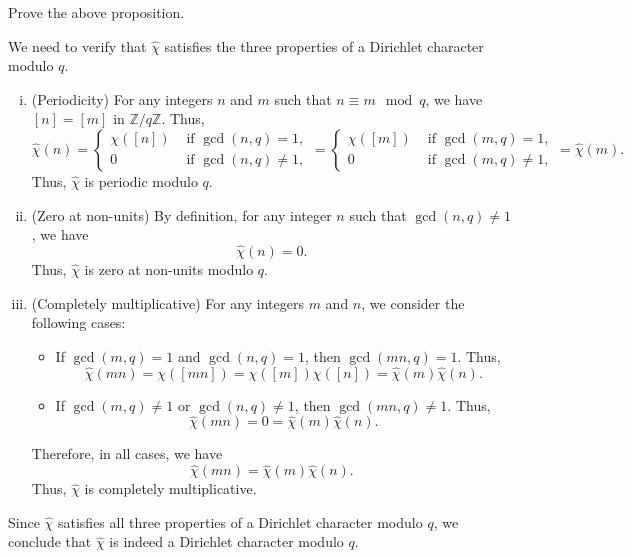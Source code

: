 \documentclass{elegantbook}
\begin{document}
\begin{exercise}
  Prove the above proposition.
\end{exercise}

\begin{solution}
  We need to verify that $\widehat{\chi}$ satisfies the three properties of a Dirichlet character modulo $q$.

  \begin{enumerate}[(i)]
    \item (Periodicity) For any integers $n$ and $m$ such that $n \equiv m \mod q$, we have $[n] = [m]$ in $\mathbb{Z}/q\mathbb{Z}$. Thus,
    \[
      \widehat{\chi}(n) = \begin{cases}
        \chi([n]) & \text{ if } \gcd(n,q) = 1, \\
        0 & \text{ if } \gcd(n,q) \ne 1,
      \end{cases} = \begin{cases}
        \chi([m]) & \text{ if } \gcd(m,q) = 1, \\
        0 & \text{ if } \gcd(m,q) \ne 1,
      \end{cases} = \widehat{\chi}(m).
    \]
    Thus, $\widehat{\chi}$ is periodic modulo $q$.
    \item (Zero at non-units) By definition, for any integer $n$ such that $\gcd(n,q) \ne 1$, we have
    \[
      \widehat{\chi}(n) = 0.
    \]
    Thus, $\widehat{\chi}$ is zero at non-units modulo $q$.
    \item (Completely multiplicative) For any integers $m$ and $n$, we consider the following cases:
    \begin{itemize}
      \item If $\gcd(m,q) = 1$ and $\gcd(n,q) = 1$, then $\gcd(mn,q) = 1$. Thus,
      \[
        \widehat{\chi}(mn) = \chi([mn]) = \chi([m])\chi([n]) = \widehat{\chi}(m)\widehat{\chi}(n).
      \]
      \item If $\gcd(m,q) \ne 1$ or $\gcd(n,q) \ne 1$, then $\gcd(mn,q) \ne 1$. Thus,
      \[
        \widehat{\chi}(mn) = 0 = \widehat{\chi}(m)\widehat{\chi}(n).
      \]
    \end{itemize}
    Therefore, in all cases, we have
    \[
      \widehat{\chi}(mn) = \widehat{\chi}(m)\widehat{\chi}(n).
    \]
    Thus, $\widehat{\chi}$ is completely multiplicative.
  \end{enumerate}
  Since $\widehat{\chi}$ satisfies all three properties of a Dirichlet character modulo $q$, we conclude that $\widehat{\chi}$ is indeed a Dirichlet character modulo $q$.
\end{solution}
\end{document}

